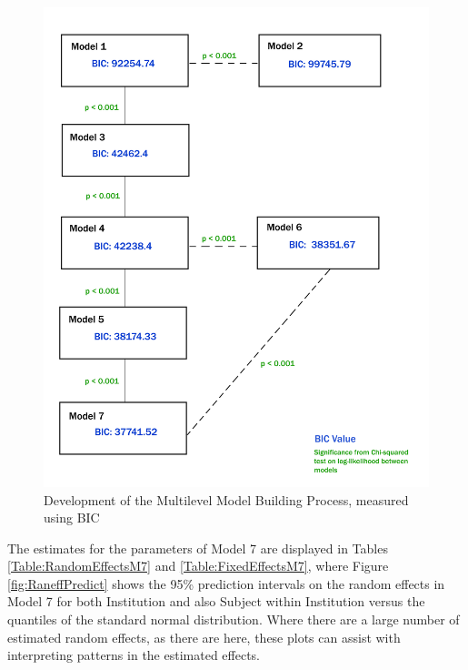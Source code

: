 \documentclass[11pt,a4paper]{report}
\begin{document}
\begin{figure}
\centering
\includegraphics[width=1\linewidth]{images/MLMModelResults}
\caption{Development of the Multilevel Model Building Process, measured using BIC}
\label{fig:MLMModelResults}
\end{figure}

The estimates for the parameters of Model 7 are displayed in Tables \ref{Table:RandomEffectsM7} and \ref{Table:FixedEffectsM7}, where Figure \ref{fig:RaneffPredict} shows the 95\% prediction intervals on the random effects in Model 7 for both Institution and also Subject within Institution versus the quantiles of the standard normal distribution. Where there are a large number of estimated random effects, as there are here, these plots can assist with interpreting patterns in the estimated effects. 
\end{document}

